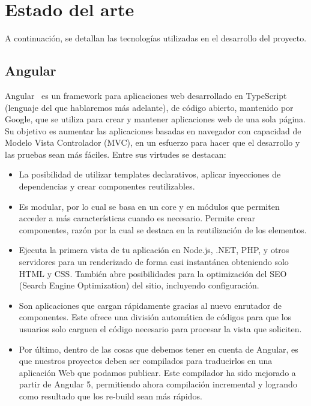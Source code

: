 \documentclass[a4paper, 12pt]{book}
\begin{document}

\cleardoublepage
\chapter{Estado del arte}
\label{chap:estado}

A continuación, se detallan las tecnologías utilizadas en el desarrollo del proyecto.



\section{Angular} 
\label{sec:Angular}
Angular~\cite{angular} es un framework para aplicaciones web desarrollado en TypeScript (lenguaje del que hablaremos más adelante), de código abierto, mantenido por Google, que se utiliza para crear y mantener aplicaciones web de una sola página. Su objetivo es aumentar las aplicaciones basadas en navegador con capacidad de Modelo Vista Controlador (MVC), en un esfuerzo para hacer que el desarrollo y las pruebas sean más fáciles.
\vfill
Entre sus virtudes se destacan:
\begin{itemize}
\item La posibilidad de utilizar templates declarativos, aplicar inyecciones de dependencias y crear componentes reutilizables.

\item Es modular, por lo cual se basa en un core y en módulos que permiten acceder a más características cuando es necesario. Permite crear componentes, razón por la cual se destaca en la reutilización de los elementos.


\item Ejecuta la primera vista de tu aplicación en Node.js, .NET, PHP, y otros servidores para un renderizado de forma casi instantánea obteniendo solo HTML y CSS. También abre posibilidades para la optimización del SEO (Search Engine Optimization) del sitio, incluyendo configuración.

\item Son aplicaciones que cargan rápidamente gracias al nuevo enrutador de componentes. Este ofrece una división automática de códigos para que los usuarios solo carguen el código necesario para procesar la vista que soliciten.

\item Por último, dentro de las cosas que debemos tener en cuenta de Angular, es que nuestros proyectos deben ser compilados para traducirlos en una aplicación Web que podamos publicar. Este compilador ha sido mejorado a partir de Angular 5, permitiendo ahora compilación incremental y logrando como resultado que los re-build sean más rápidos.
\end{itemize}
\end{document}
